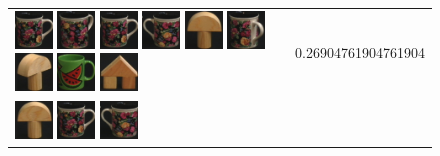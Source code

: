\begin{figure}[tbp]
\begin{center}
\begin{tabular}{m{11cm} | m{3cm} |}
\includegraphics[width=1cm]{coil/beeld-60.eps}
\includegraphics[width=1cm]{coil/beeld-63.eps}
\includegraphics[width=1cm]{coil/beeld-60.eps}
\includegraphics[width=1cm]{coil/beeld-61.eps}
\includegraphics[width=1cm]{coil/beeld-1.eps}
\includegraphics[width=1cm]{coil/beeld-64.eps}
\includegraphics[width=1cm]{coil/beeld-3.eps}
\includegraphics[width=1cm]{coil/beeld-30.eps}
\includegraphics[width=1cm]{coil/beeld-43.eps}
& {\scriptsize 0.26904761904761904}
\\
\includegraphics[width=1cm]{coil/beeld-0.eps}
\includegraphics[width=1cm]{coil/beeld-60.eps}
\includegraphics[width=1cm]{coil/beeld-61.eps}

\end{tabular}
\end{center}
\end{figure}
